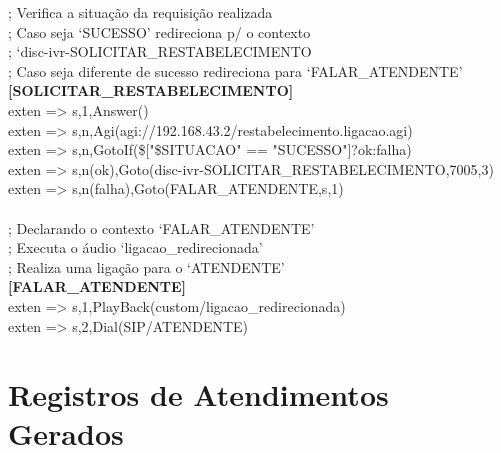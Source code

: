 \begin{apendicesenv}
; Verifica a situação da requisição realizada \\
; Caso seja ‘SUCESSO’ redireciona p/ o contexto \\
; ‘disc-ivr-SOLICITAR\_RESTABELECIMENTO \\
; Caso seja diferente de sucesso redireciona para ‘FALAR\_ATENDENTE’ \\
\textbf{[SOLICITAR\_RESTABELECIMENTO]} \\
exten => s,1,Answer() \\
exten => s,n,Agi(agi://192.168.43.2/restabelecimento.ligacao.agi) \\
exten => s,n,GotoIf(\$["\${SITUACAO}" == "SUCESSO"]?ok:falha) \\
exten => s,n(ok),Goto(disc-ivr-SOLICITAR\_RESTABELECIMENTO,7005,3) \\
exten => s,n(falha),Goto(FALAR\_ATENDENTE,s,1) \\
 \\
; Declarando o contexto ‘FALAR\_ATENDENTE’ \\
; Executa o áudio ‘ligacao\_redirecionada’ \\
; Realiza uma ligação para o ‘ATENDENTE’ \\
\textbf{[FALAR\_ATENDENTE]} \\
exten => s,1,PlayBack(custom/ligacao\_redirecionada) \\
exten => s,2,Dial(SIP/ATENDENTE) \\


\chapter{Registros de Atendimentos Gerados}


\end{apendicesenv}
